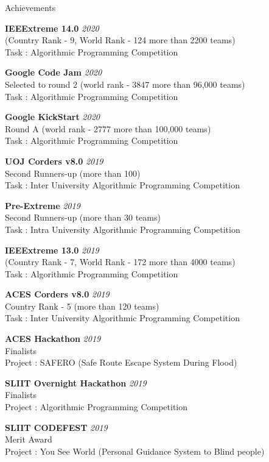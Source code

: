 \documentclass{resume} %
\begin{document}
\begin{rSection}{Achievements}

{\bf IEEExtreme 14.0} \hfill {\em 2020}
\\ (Country Rank - 9, World Rank - 124 more than 2200 teams)
\\Task : Algorithmic Programming Competition


{\bf Google Code Jam} \hfill {\em 2020}
\\Selected to round 2 (world rank - 3847 more than 96,000 teams)
\\Task : Algorithmic Programming Competition

{\bf Google KickStart} \hfill {\em 2020}
\\Round A (world rank - 2777 more than 100,000 teams)
\\Task : Algorithmic Programming Competition

{\bf UOJ Corders v8.0 } \hfill {\em 2019}
\\Second Runners-up (more than 100)
\\Task : Inter University Algorithmic Programming Competition

{\bf Pre-Extreme } \hfill {\em 2019}
\\Second Runners-up (more than 30 teams)
\\Task : Intra University Algorithmic Programming Competition

{\bf IEEExtreme 13.0} \hfill {\em 2019}
\\ (Country Rank - 7, World Rank - 172 more than 4000 teams)
\\Task : Algorithmic Programming Competition

{\bf ACES Corders v8.0 } \hfill {\em 2019}
\\Country Rank - 5 (more than 120 teams)
\\Task : Inter University Algorithmic Programming Competition

{\bf ACES Hackathon } \hfill {\em 2019}
\\Finalists
\\Project : SAFERO (Safe Route Escape System During Flood)

{\bf SLIIT Overnight Hackathon } \hfill {\em 2019}
\\Finalists
\\Project : Algorithmic Programming Competition

{\bf SLIIT CODEFEST } \hfill {\em 2019}
\\Merit Award
\\Project : You See World (Personal Guidance System to Blind people)


\end{rSection}
\end{document}

